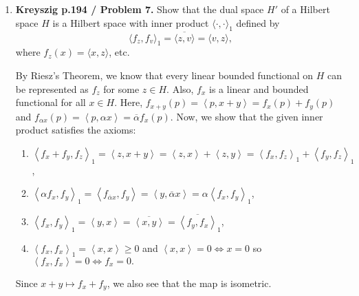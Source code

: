 \documentclass[12pt]{article}
\newcommand{\inn}[2]{\left\langle #1, #2 \right\rangle}
\begin{document}
\begin{enumerate}
\item \textbf{Kreyszig p.194 / Problem 7.}
Show that the dual space $H'$ of a Hilbert space $H$
is a Hilbert space with inner product $\langle\cdot,\cdot
\rangle_1$ defined by
$$\langle f_z,f_v\rangle_1=\overline{\langle z,v\rangle
}=\langle v,z\rangle,$$
where $f_z(x)=\langle x,z\rangle$, etc.
\begin{mybox}

    By Riesz's Theorem, we know that every linear bounded
    functional on $H$ can be represented as $f_z$
    for some $z\in H$. Also, $f_x$ is a linear and bounded
    functional for all $x\in H$. Here, $f_{x+y}(p)=\inn{p}
    {x+y}=f_x(p)+f_y(p)$ and $f_{\alpha x}(p)=\inn{p}
    {\alpha x}=\overline{\alpha}f_x(p)$.
    Now, we show that the
    given inner product satisfies the axioms:

    \begin{enumerate}
        \item $\inn{f_x+f_y}{f_z}_1=\inn{z}{x+y}=
        \inn{z}{x}+\inn{z}{y}=\inn{f_x}{f_z}_1+
        \inn{f_y}{f_z}_1$,

        \item $\inn{\alpha f_x}{f_y}_1=\inn{f_{
        \overline{\alpha} x}}{f_y}
        =\inn{y}{\overline{\alpha} x}=\alpha\inn{f_x}{f_y}
        _1$,

        \item $\inn{f_x}{f_y}_1=\inn{y}{x}=\overline{
        \inn{x}{y}}=\overline{\inn{f_y}{f_x}}_1$,

        \item $\inn{f_x}{f_x}_1=\inn{x}{x}\geq 0$
        and $\inn{x}{x}=0 \iff x=0$ so $\inn{f_x}{f_x}=0
        \iff f_x=0.$
    \end{enumerate}

    Since $x+y\mapsto f_x+f_y$, we also see that the map
    is isometric.
\end{mybox}

\end{enumerate}
\end{document}
